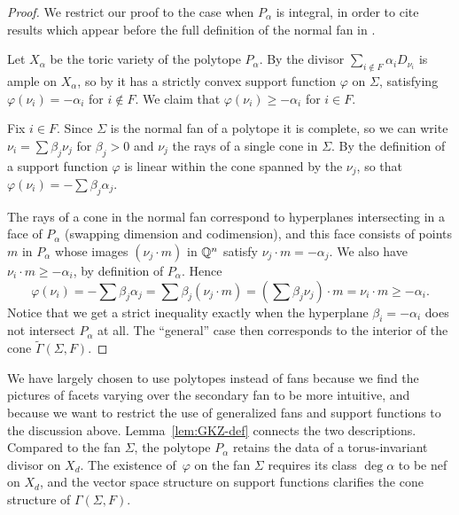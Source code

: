 \documentclass{article}
\begin{document}
\begin{proof}
  We restrict our proof to the case when $P_\alpha$ is integral, in order to cite results which appear before the full definition of the normal fan in \cite[Proposition 14.2.10]{CLS2011}.

  Let $X_\alpha$ be the toric variety of the polytope $P_\alpha$.  By \cite[Proposition~6.1.10]{CLS2011} the divisor $\sum_{i\notin F}\alpha_iD_{\nu_i}$ is ample on $X_\alpha$, so by \cite[Theorem~6.1.14]{CLS2011} it has a strictly convex support function $\varphi$ on $\Sigma$, satisfying $\varphi(\nu_i)=-\alpha_i$ for $i\notin F$.  We claim that $\varphi(\nu_i)\geq-\alpha_i$ for $i\in F$.

  Fix $i\in F$.  Since $\Sigma$ is the normal fan of a polytope it is complete, so we can write $\nu_i=\sum\beta_j\nu_j$ for $\beta_j>0$ and $\nu_j$ the rays of a single cone in $\Sigma$.  By the definition of a support function $\varphi$ is linear within the cone spanned by the $\nu_j$, so that $\varphi(\nu_i)=-\sum\beta_j\alpha_j$.

  The rays of a cone in the normal fan correspond to hyperplanes intersecting in a face of $P_\alpha$ (swapping dimension and codimension), and this face consists of points $m$ in $P_\alpha$ whose images $(\nu_j\cdot m)$ in $\mathbb Q^n$ satisfy $\nu_j\cdot m=-\alpha_j$.  We also have $\nu_i\cdot m \geq -\alpha_i$, by definition of $P_\alpha$.  Hence
  \[\varphi(\nu_i)=-\sum\beta_j\alpha_j=\sum\beta_j(\nu_j\cdot m)=\left(\sum\beta_j\nu_j\right)\cdot m=\nu_i\cdot m\geq-\alpha_i.\]
  Notice that we get a strict inequality exactly when the hyperplane $\beta_i=-\alpha_i$ does not intersect $P_\alpha$ at all.  The ``general'' case then corresponds to the interior of the cone $\tilde\Gamma(\Sigma,F)$.
\end{proof}

\begin{rem}
  We have largely chosen to use polytopes instead of fans because we find the pictures of facets varying over the secondary fan to be more intuitive, and because we want to restrict the use of generalized fans and support functions to the discussion above.  Lemma~\ref{lem:GKZ-def} connects the two descriptions.  Compared to the fan $\Sigma$, the polytope $P_\alpha$ retains the data of a torus-invariant divisor on $X_d$.  The existence of~$\varphi$ on the fan $\Sigma$ requires its class $\deg\alpha$ to be nef on $X_d$, and the vector space structure on support functions clarifies the cone structure of $\Gamma(\Sigma,F)$.
\end{rem}
\end{document}
